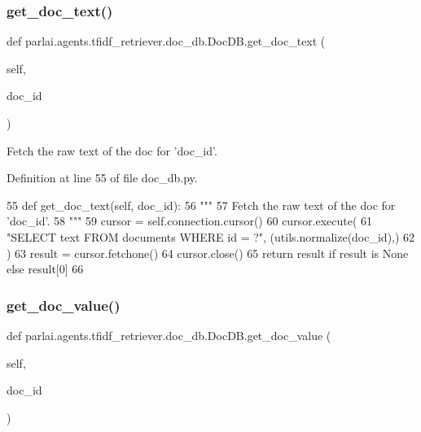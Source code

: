 \subsubsection{\texorpdfstring{get\+\_\+doc\+\_\+text()}{get\_doc\_text()}}
{\footnotesize\ttfamily def parlai.\+agents.\+tfidf\+\_\+retriever.\+doc\+\_\+db.\+Doc\+D\+B.\+get\+\_\+doc\+\_\+text (\begin{DoxyParamCaption}\item[{}]{self,  }\item[{}]{doc\+\_\+id }\end{DoxyParamCaption})}

\begin{DoxyVerb}Fetch the raw text of the doc for 'doc_id'.
\end{DoxyVerb}
 

Definition at line 55 of file doc\+\_\+db.\+py.


\begin{DoxyCode}
55     \textcolor{keyword}{def }get\_doc\_text(self, doc\_id):
56         \textcolor{stringliteral}{"""}
57 \textcolor{stringliteral}{        Fetch the raw text of the doc for 'doc\_id'.}
58 \textcolor{stringliteral}{        """}
59         cursor = self.connection.cursor()
60         cursor.execute(
61             \textcolor{stringliteral}{"SELECT text FROM documents WHERE id = ?"}, (utils.normalize(doc\_id),)
62         )
63         result = cursor.fetchone()
64         cursor.close()
65         \textcolor{keywordflow}{return} result \textcolor{keywordflow}{if} result \textcolor{keywordflow}{is} \textcolor{keywordtype}{None} \textcolor{keywordflow}{else} result[0]
66 
\end{DoxyCode}
\mbox{\label{classparlai_1_1agents_1_1tfidf__retriever_1_1doc__db_1_1DocDB_ae329b599aa42f545dc6108a4acdd266f}} 
\subsubsection{\texorpdfstring{get\+\_\+doc\+\_\+value()}{get\_doc\_value()}}
{\footnotesize\ttfamily def parlai.\+agents.\+tfidf\+\_\+retriever.\+doc\+\_\+db.\+Doc\+D\+B.\+get\+\_\+doc\+\_\+value (\begin{DoxyParamCaption}\item[{}]{self,  }\item[{}]{doc\+\_\+id }\end{DoxyParamCaption})}

